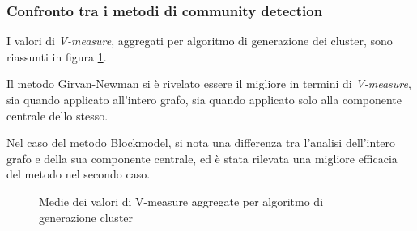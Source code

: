 \documentclass[12pt,a4paper,twoside]{report}
\begin{document}
\subsubsection{Confronto tra i metodi di community detection}

I valori di \textit{V-measure}, aggregati per algoritmo di generazione dei cluster, sono riassunti
in figura \ref{img:vmeasurecluster}.

Il metodo Girvan-Newman si è rivelato essere il migliore in termini di \textit{V-measure}, sia
quando applicato all'intero grafo, sia quando applicato solo alla componente centrale dello stesso.

Nel caso del metodo Blockmodel, si nota una differenza tra l'analisi dell'intero grafo e della sua
componente centrale, ed è stata rilevata una migliore efficacia del metodo nel secondo caso.

\begin{figure}[H]
    \begin{minipage}[c]{0.60\textwidth}
    \setlength{\fboxrule}{0pt}	%
    \end{minipage}
    \begin{minipage}[c]{0.32\textwidth}
    \caption{Medie dei valori di V-measure aggregate per algoritmo di generazione cluster }
    \label{img:vmeasurecluster}
    \end{minipage}
\end{figure}

\end{document}
